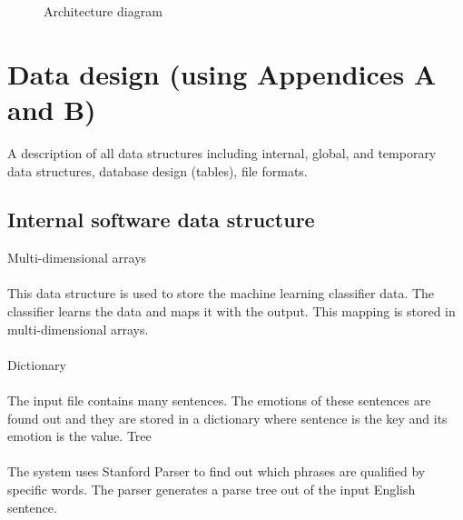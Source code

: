 \documentclass[oneside,a4paper,12pt]{book}
\begin{document}
 
  \begin{center}
	\begin{figure}[!htbp]
		\centering
	  \caption{Architecture diagram}
	  \label{fig:arch-dig}
	\end{figure}
\end{center} 


\section{Data design (using Appendices A and B)}   
A description of all data structures including internal, global, and temporary data structures, database design (tables), file formats.
\subsection{Internal software data structure}
Multi-dimensional arrays\\\\
This data structure is used to store the machine learning classifier data. The classifier learns the data and maps it with the output. This mapping is stored in multi-dimensional arrays.\\\\
Dictionary\\\\
The input file contains many sentences. The emotions of these sentences are found out and they are stored in a dictionary where sentence is the key and its emotion is the value.
Tree\\\\
The system uses Stanford Parser to find out which phrases are qualified by specific words. The parser generates a parse tree out of the input English sentence.
\end{document}
